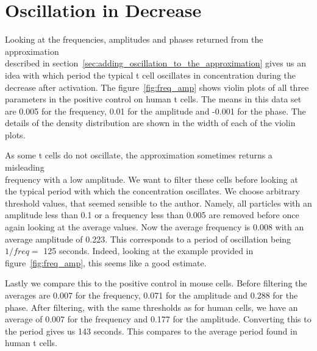 \newpage
\section{Oscillation in Decrease}
\label{sec:oscillation_in_decrease}

Looking at the frequencies, amplitudes and phases returned from the approximation\\ described in section~\ref{sec:adding_oscillation_to_the_approximation} gives us an idea with which period the typical t cell oscillates in \Calcium concentration during the decrease after activation. The figure~\ref{fig:freq_amp} shows violin plots of all three parameters in the positive control on human t cells. The means in this data set are 0.005 for the frequency, 0.01 for the amplitude and -0.001 for the phase. The details of the density distribution are shown in the width of each of the violin plots.

As some t cells do not oscillate, the approximation sometimes returns a misleading\\ frequency with a low amplitude. We want to filter these cells before looking at the typical period with which the \Calcium concentration oscillates. We choose arbitrary threshold values, that seemed sensible to the author. Namely, all particles with an amplitude less than 0.1 or a frequency less than 0.005 are removed before once again looking at the average values. Now the average frequency is 0.008 with an average amplitude of 0.223. This corresponds to a period of oscillation being $1/freq = $ 125 seconds. Indeed, looking at the example provided in figure~\ref{fig:freq_amp}, this seems like a good estimate.

Lastly we compare this to the positive control in mouse cells. Before filtering the averages are 0.007 for the frequency, 0.071 for the amplitude and 0.288 for the phase. After filtering, with the same thresholds as for human cells, we have an average of 0.007 for the frequency and 0.177 for the amplitude. Converting this to the period gives us 143 seconds. This compares to the average period found in human t cells.

